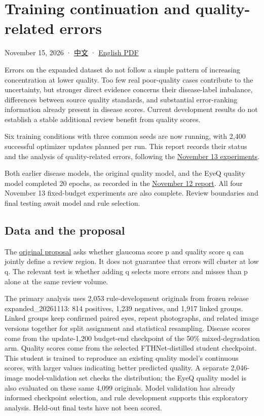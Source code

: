 \documentclass[
  10pt,
]{article}
\author{}
\date{}
\begin{document}
\section{Training continuation and quality-related
errors}\label{training-continuation-and-quality-related-errors}

November 15, 2026 · \href{quality-and-training.zh.md}{中文} ·
\href{quality-and-training.en.pdf}{English PDF}

Errors on the expanded dataset do not follow a simple pattern of
increasing concentration at lower quality. Too few real poor-quality
cases contribute to the uncertainty, but stronger direct evidence
concerns their disease-label imbalance, differences between source
quality standards, and substantial error-ranking information already
present in disease scores. Current development results do not establish
a stable additional review benefit from quality scores.

Six training conditions with three common seeds are now running, with
2,400 successful optimizer updates planned per run. This report records
their status and the analysis of quality-related errors, following the
\href{../2026-11-13/README.en.md}{November 13 experiments}.

Both earlier disease models, the original quality model, and the EyeQ
quality model completed 20 epochs, as recorded in the
\href{../2026-11-12/training-progress.en.md}{November 12 report}. All
four November 13 fixed-budget experiments are also complete. Review
boundaries and final testing await model and rule selection.

\subsection{Data and the proposal}\label{data-and-the-proposal}

The \href{../../../proposal-1106.pdf}{original proposal} asks whether
glaucoma score p and quality score q can jointly define a review region.
It does not guarantee that errors will cluster at low q. The relevant
test is whether adding q selects more errors and misses than p alone at
the same review volume.

The primary analysis uses 2,053 rule-development originals from frozen
release expanded\_20261113: 814 positives, 1,239 negatives, and 1,917
linked groups. Linked groups keep confirmed paired eyes, repeat
photographs, and related image versions together for split assignment
and statistical resampling. Disease scores come from the update-1,200
budget-end checkpoint of the 50\% mixed-degradation arm. Quality scores
come from the selected FTHNet-distilled student checkpoint. This student
is trained to reproduce an existing quality model's continuous scores,
with larger values indicating better predicted quality. A separate
2,046-image model-validation set checks the distribution; the EyeQ
quality model is also evaluated on these same 4,099 originals. Model
validation has already informed checkpoint selection, and rule
development supports this exploratory analysis. Held-out final tests
have not been scored.
\end{document}
